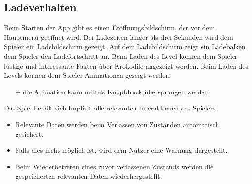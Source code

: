 \subsection{Ladeverhalten}
\begin {requirements}
	 Beim Starten der App gibt es einen Eröffnungsbildschirm, der vor dem Hauptmenü geöffnet wird.
	 Bei Ladezeiten länger als drei Sekunden wird dem Spieler ein Ladebildschirm gezeigt.
	 Auf dem Ladebildschirm zeigt ein Ladebalken dem Spieler den Ladefortschritt an.
	 Beim Laden des Level können dem Spieler lustige und interessante Fakten über Krokodile angezeigt werden.
	 Beim Laden des Levels können dem Spieler Animationen gezeigt werden. 
	\begin{itemize}
		\item[+] die Animation kann mittels Knopfdruck übersprungen werden.
	\end{itemize}
	 Das Spiel behält sich Implizit alle relevanten Interaktionen des Spielers.
	\begin{itemize}
		\item Relevante Daten werden beim Verlassen von Zuständen automatisch gesichert.
		\item Falls dies nicht möglich ist, wird dem Nutzer eine Warnung dargestellt.
		\item Beim Wiederbetreten eines zuvor verlassenen Zustands werden die gespeicherten relevanten Daten wiederhergestellt.
	\end{itemize}
\end {requirements}
